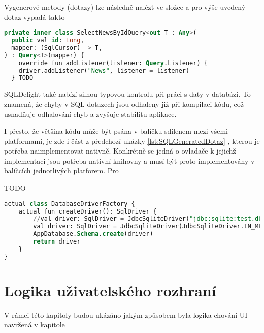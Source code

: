 Vygenerové metody (dotazy) lze následně nalézt ve složce \code{} a pro výše uvedený dotaz vypadá takto

\begin{lstlisting}[caption={SQL vygenerovaný dotaz}, label={lst:SQLGeneratedDotaz}, language=SQL]
private inner class SelectNewsByIdQuery<out T : Any>(
  public val id: Long,
  mapper: (SqlCursor) -> T,
) : Query<T>(mapper) {
    override fun addListener(listener: Query.Listener) {
    driver.addListener("News", listener = listener)
  } TODO
  \end{lstlisting}
  

SQLDelight také nabízí silnou typovou kontrolu při práci s daty v databázi. To znamená, že chyby v SQL dotazech jsou odhaleny již při
 kompilaci kódu, což usnadňuje odhalování chyb a zvyšuje stabilitu aplikace.

I přesto, že většina kódu může být psána v balíčku sdílenem mezi všemi platformami, je zde i část z předchozí ukázky \ref{lst:SQLGeneratedDotaz}
, kterou je potřeba naimplementovat nativně. Konkrétně se jedná o ovladače k jejichž implementaci jsou potřeba nativní knihovny a musí
být proto implementovány v balíčcích jednotlivých platforem. Pro 

TODO
\begin{lstlisting}[caption={SQL vygenerovaný dotaz}, label={lst:SQLGeneratedDotaz}, language=SQL]
  actual class DatabaseDriverFactory {
    actual fun createDriver(): SqlDriver {
        //val driver: SqlDriver = JdbcSqliteDriver("jdbc:sqlite:test.db")
        val driver: SqlDriver = JdbcSqliteDriver(JdbcSqliteDriver.IN_MEMORY)
        AppDatabase.Schema.create(driver)
        return driver
    }
}
\end{lstlisting}







\section{Logika uživatelského rozhraní} \label{UILayerImpl}
V rámci této kapitoly budou ukázáno jakým způsobem byla logika chování UI navržená v kapitole 



